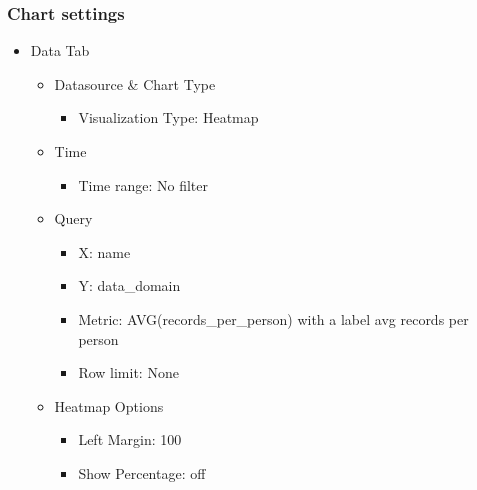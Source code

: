 \documentclass[
]{book}
\providecommand{\tightlist}{%
  \setlength{\itemsep}{0pt}\setlength{\parskip}{0pt}}
\begin{document}
\hypertarget{chart-settings-28}{%
\subsubsection*{Chart settings}\label{chart-settings-28}}

\begin{itemize}
\tightlist
\item
  Data Tab

  \begin{itemize}
  \tightlist
  \item
    Datasource \& Chart Type

    \begin{itemize}
    \tightlist
    \item
      Visualization Type: Heatmap
    \end{itemize}
  \item
    Time

    \begin{itemize}
    \tightlist
    \item
      Time range: No filter
    \end{itemize}
  \item
    Query

    \begin{itemize}
    \tightlist
    \item
      X: name
    \item
      Y: data\_domain
    \item
      Metric: AVG(records\_per\_person) with a label avg records per person
    \item
      Row limit: None
    \end{itemize}
  \item
    Heatmap Options

    \begin{itemize}
    \tightlist
    \item
      Left Margin: 100
    \item
      Show Percentage: off
    \end{itemize}
  \end{itemize}
\end{itemize}

  
\end{document}
